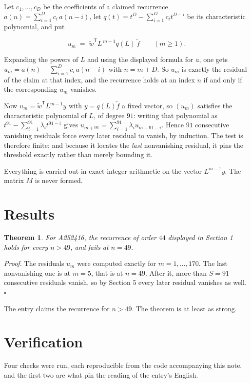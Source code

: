 \documentclass[11pt]{article}
\newtheorem{theorem}{Theorem}
\theoremstyle{definition}
\begin{document}
Let $c_1,\dots,c_D$ be the coefficients of a claimed recurrence $a(n) = \sum_{i=1}^{D} c_i\,a(n-i)$, let $q(t) = t^{D} - \sum_{i=1}^{D} c_i t^{D-i}$ be its characteristic polynomial, and put

\[u_m \;=\; \tilde w^{\mathsf T} L^{\,m-1} q(L)\,\tilde f \qquad (m \ge 1).\]

Expanding the powers of $L$ and using the displayed formula for $a$, one gets $u_m = a(n) - \sum_{i=1}^{D} c_i\,a(n-i)$ with $n = m + D$. So $u_m$ is exactly the residual of the claim at that index, and the recurrence holds at an index $n$ if and only if the corresponding $u_m$ vanishes.

Now $u_m = \tilde w^{\mathsf T} L^{m-1} y$ with $y = q(L)\tilde f$ a fixed vector, so $(u_m)$ satisfies the characteristic polynomial of $L$, of degree $91$: writing that polynomial as $t^{91} - \sum_{i=1}^{91} \lambda_i t^{91-i}$ gives $u_{m+91} = \sum_{i=1}^{91} \lambda_i u_{m+91-i}$. Hence $91$ consecutive vanishing residuals force every later residual to vanish, by induction. The test is therefore finite; and because it locates the {\itshape last} nonvanishing residual, it pins the threshold exactly rather than merely bounding it.

Everything is carried out in exact integer arithmetic on the vector $L^{m-1}y$. The matrix $M$ is never formed.

\section{Results}

\begin{theorem} For A252416, the recurrence of order $44$ displayed in Section 1 holds for every $n > 49$, and fails at $n = 49$.\end{theorem}

{\itshape Proof.} The residuals $u_m$ were computed exactly for $m = 1,\dots,170$. The last nonvanishing one is at $m = 5$, that is at $n = 49$. After it, more than $S = 91$ consecutive residuals vanish, so by Section 5 every later residual vanishes as well. $\square$

The entry claims the recurrence for $n > 49$. The theorem is at least as strong.

\section{Verification}

Four checks were run, each reproducible from the code accompanying this note, and the first two are what pin the reading of the entry's English.
\end{document}
